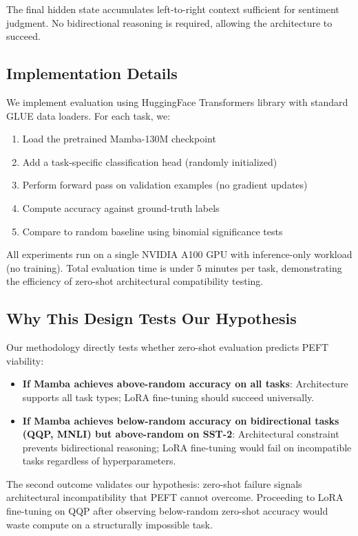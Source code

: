 The final hidden state accumulates left-to-right context sufficient for sentiment judgment. No bidirectional reasoning is required, allowing the architecture to succeed.

\subsection{Implementation Details}

We implement evaluation using HuggingFace Transformers library with standard GLUE data loaders. For each task, we:

\begin{enumerate}
\item Load the pretrained Mamba-130M checkpoint
\item Add a task-specific classification head (randomly initialized)
\item Perform forward pass on validation examples (no gradient updates)
\item Compute accuracy against ground-truth labels
\item Compare to random baseline using binomial significance tests
\end{enumerate}

All experiments run on a single NVIDIA A100 GPU with inference-only workload (no training). Total evaluation time is under 5 minutes per task, demonstrating the efficiency of zero-shot architectural compatibility testing.

\subsection{Why This Design Tests Our Hypothesis}

Our methodology directly tests whether zero-shot evaluation predicts PEFT viability:

\begin{itemize}
\item \textbf{If Mamba achieves above-random accuracy on all tasks}: Architecture supports all task types; LoRA fine-tuning should succeed universally.
\item \textbf{If Mamba achieves below-random accuracy on bidirectional tasks (QQP, MNLI) but above-random on SST-2}: Architectural constraint prevents bidirectional reasoning; LoRA fine-tuning would fail on incompatible tasks regardless of hyperparameters.
\end{itemize}

The second outcome validates our hypothesis: zero-shot failure signals architectural incompatibility that PEFT cannot overcome. Proceeding to LoRA fine-tuning on QQP after observing below-random zero-shot accuracy would waste compute on a structurally impossible task.

